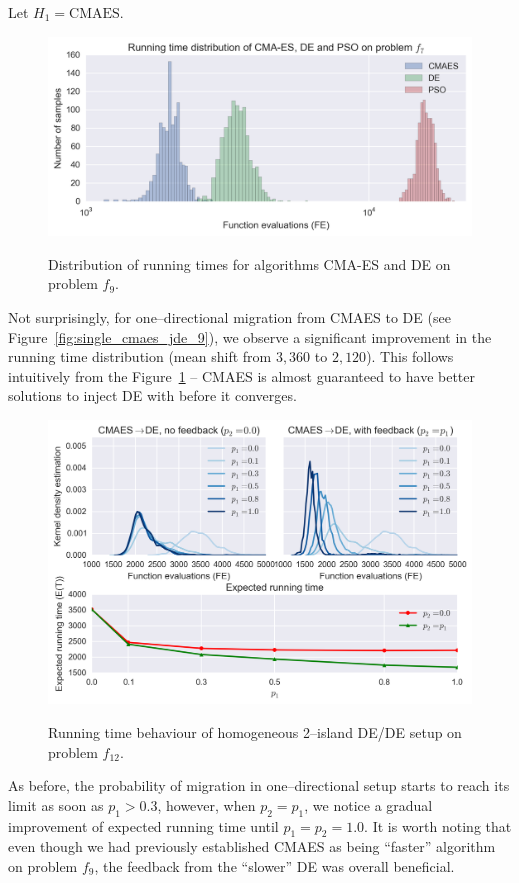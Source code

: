 \documentclass{sig-alternate}
\begin{document}
Let $H_1 = \mbox{CMAES}$.
\begin{figure}[ht]
    \centering
    \includegraphics[width=\columnwidth]{figures/single_distr_7.png}
    \label{fig:distr_cmaes_jde_9}
    \caption{Distribution of running times for algorithms CMA-ES and DE on problem $f_9$.}
\end{figure}
Not surprisingly, for one--directional migration from CMAES to DE (see Figure~\ref{fig:single_cmaes_jde_9}), we observe a significant improvement in the running time distribution (mean shift from $3,360$ to $2,120$).
This follows intuitively from the Figure~\ref{fig:distr_cmaes_jde_9} -- CMAES is almost guaranteed to have better solutions to inject DE with before it converges.
\begin{figure}[ht]
  \centering
  \includegraphics[width=\columnwidth]{figures/single_cmaes_jde_cec_7.png}
  \label{fig:single_jde_jde_7}
 \caption{Running time behaviour of homogeneous 2--island DE/DE setup on problem $f_{12}$.}
\end{figure}
As before, the probability of migration in one--directional setup starts to reach its limit as soon as $p_1 > 0.3$, however, when $p_2 = p_1$, we notice a gradual improvement of expected running time until $p_1=p_2=1.0$.
It is worth noting that even though we had previously established CMAES as being ``faster'' algorithm on problem $f_9$, the feedback from the ``slower'' DE was overall beneficial.
\end{document}
